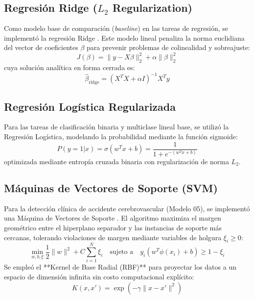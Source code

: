 \documentclass[12pt,letterpaper]{article}
\begin{document}
\subsection{Regresión Ridge ($L_2$ Regularization)}
Como modelo base de comparación (\textit{baseline}) en las tareas de regresión, se implementó la regresión Ridge \cite{hoerl1970ridge}. Este modelo lineal penaliza la norma euclidiana del vector de coeficientes $\beta$ para prevenir problemas de colinealidad y sobreajuste:
\begin{equation}
    J(\beta) = \|y - X\beta\|_2^2 + \alpha \|\beta\|_2^2
\end{equation}
cuya solución analítica en forma cerrada es:
\begin{equation}
    \hat{\beta}_{\text{ridge}} = (X^T X + \alpha I)^{-1} X^T y
\end{equation}

\subsection{Regresión Logística Regularizada}
Para las tareas de clasificación binaria y multiclase lineal base, se utilizó la Regresión Logística, modelando la probabilidad mediante la función sigmoide:
\begin{equation}
    P(y=1|x) = \sigma(w^T x + b) = \frac{1}{1 + e^{-(w^T x + b)}}
\end{equation}
optimizada mediante entropía cruzada binaria con regularización de norma $L_2$.

\subsection{Máquinas de Vectores de Soporte (SVM)}
Para la detección clínica de accidente cerebrovascular (Modelo 05), se implementó una Máquina de Vectores de Soporte \cite{cortes1995support}. El algoritmo maximiza el margen geométrico entre el hiperplano separador y las instancias de soporte más cercanas, tolerando violaciones de margen mediante variables de holgura $\xi_i \ge 0$:
\begin{equation}
    \min_{w, b, \xi} \frac{1}{2} \|w\|^2 + C \sum_{i=1}^N \xi_i \quad \text{sujeto a} \quad y_i (w^T \phi(x_i) + b) \ge 1 - \xi_i
\end{equation}
Se empleó el **Kernel de Base Radial (RBF)** para proyectar los datos a un espacio de dimensión infinita sin costo computacional explícito:
\begin{equation}
    K(x, x') = \exp\left(-\gamma \|x - x'\|^2\right)
\end{equation}
\end{document}
